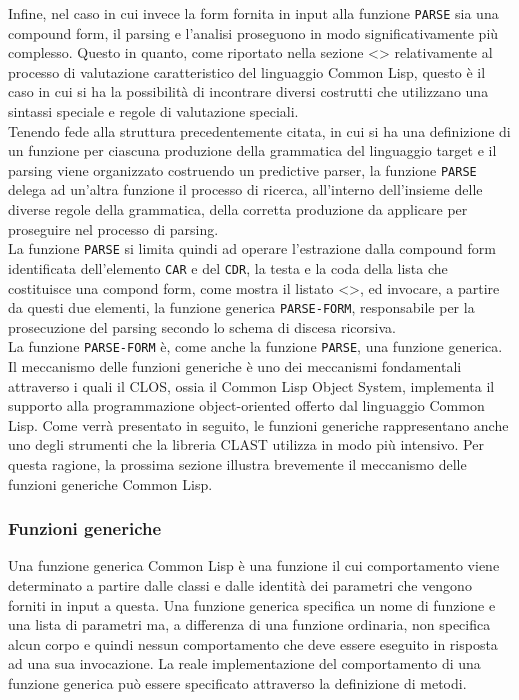 Infine, nel caso in cui invece la form fornita in input alla funzione
\texttt{PARSE} sia una compound form, il parsing e l’analisi proseguono in
modo significativamente più complesso. Questo in quanto, come riportato nella
sezione <> relativamente al processo di valutazione caratteristico del
linguaggio Common Lisp, questo è il caso in cui si ha la possibilità di
incontrare diversi costrutti che utilizzano una sintassi speciale e regole di
valutazione speciali.\\

Tenendo fede alla struttura precedentemente citata, in cui si ha una
definizione di un funzione per ciascuna produzione della grammatica del
linguaggio target e il parsing viene organizzato costruendo un predictive
parser, la funzione \texttt{PARSE} delega ad un’altra funzione il processo di
ricerca, all’interno dell’insieme delle diverse regole della grammatica, della
corretta produzione da applicare per proseguire nel processo di parsing.\\

La funzione \texttt{PARSE} si limita quindi ad operare l'estrazione dalla
compound form identificata dell’elemento \texttt{CAR} e del \texttt{CDR}, la
testa e la coda della lista che costituisce una compond form, come mostra il
listato <>, ed invocare, a partire da questi due elementi, la funzione
generica \texttt{PARSE-FORM}, responsabile per la prosecuzione del parsing
secondo lo schema di discesa ricorsiva.\\

La funzione \texttt{PARSE-FORM} è, come anche la funzione \texttt{PARSE}, una
funzione generica. Il meccanismo delle funzioni generiche è uno dei meccanismi
fondamentali attraverso i quali il CLOS, ossia il Common Lisp Object System,
implementa il supporto alla programmazione object-oriented offerto dal
linguaggio Common Lisp. Come verrà presentato in seguito, le funzioni
generiche rappresentano anche uno degli strumenti che la libreria CLAST
utilizza in modo più intensivo. Per questa ragione, la prossima sezione
illustra brevemente il meccanismo delle funzioni generiche Common Lisp.\\

\subsubsection{Funzioni generiche}

Una funzione generica Common Lisp è una funzione il cui comportamento viene
determinato a partire dalle classi e dalle identità dei parametri che vengono
forniti in input a questa. Una funzione generica specifica un nome di funzione
e una lista di parametri ma, a differenza di una funzione ordinaria, non
specifica alcun corpo e quindi nessun comportamento che deve essere eseguito
in risposta ad una sua invocazione. La reale implementazione del comportamento
di una funzione generica può essere specificato attraverso la definizione di
metodi.\\

